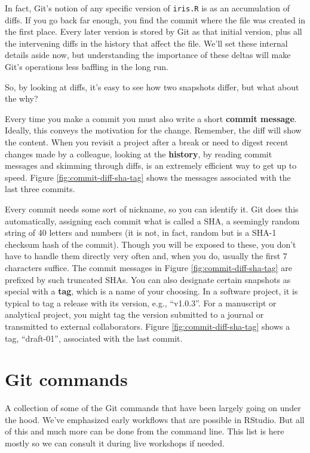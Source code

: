 \documentclass[
]{book}
\begin{document}
In fact, Git's notion of any specific version of \texttt{iris.R} is as an accumulation of diffs. If you go back far enough, you find the commit where the file was created in the first place. Every later version is stored by Git as that initial version, plus all the intervening diffs in the history that affect the file. We'll set these internal details aside now, but understanding the importance of these deltas will make Git's operations less baffling in the long run.

So, by looking at diffs, it's easy to see how two snapshots differ, but what about the why?

Every time you make a commit you must also write a short \textbf{commit message}. Ideally, this conveys the motivation for the change. Remember, the diff will show the content. When you revisit a project after a break or need to digest recent changes made by a colleague, looking at the \textbf{history}, by reading commit messages and skimming through diffs, is an extremely efficient way to get up to speed. Figure \ref{fig:commit-diff-sha-tag} shows the messages associated with the last three commits.

Every commit needs some sort of nickname, so you can identify it. Git does this automatically, assigning each commit what is called a SHA, a seemingly random string of 40 letters and numbers (it is not, in fact, random but is a SHA-1 checksum hash of the commit). Though you will be exposed to these, you don't have to handle them directly very often and, when you do, usually the first 7 characters suffice. The commit messages in Figure \ref{fig:commit-diff-sha-tag} are prefixed by such truncated SHAs. You can also designate certain snapshots as special with a \textbf{tag}, which is a name of your choosing. In a software project, it is typical to tag a release with its version, e.g., ``v1.0.3''. For a manuscript or analytical project, you might tag the version submitted to a journal or transmitted to external collaborators. Figure \ref{fig:commit-diff-sha-tag} shows a tag, ``draft-01'', associated with the last commit.

\chapter{Git commands}\label{git-commands}

A collection of some of the Git commands that have been largely going on under the hood.
We've emphasized early workflows that are possible in RStudio.
But all of this and much more can be done from the command line.
This list is here mostly so we can consult it during live workshops if needed.
\end{document}
